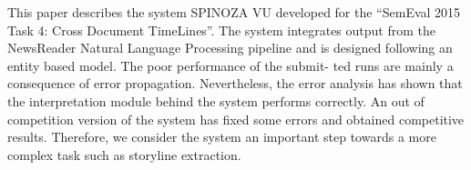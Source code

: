 This paper describes the system SPINOZA VU developed for the ``SemEval 2015 Task 4: Cross Document TimeLines''. The system integrates output from the NewsReader Natural Language Processing pipeline and is designed following an entity based model. The poor performance of the submit- ted runs are mainly a consequence of error propagation. Nevertheless, the error analysis has shown that the interpretation module behind the system performs correctly. An out of competition version of the system has fixed some errors and obtained competitive results. Therefore, we consider the system an important step towards a more complex task such as storyline extraction.
